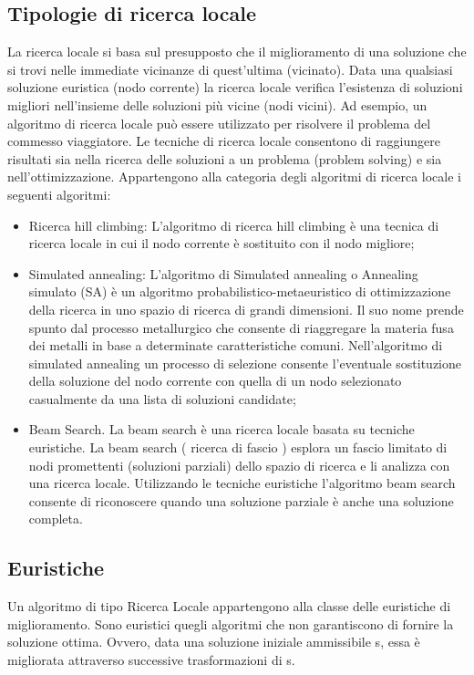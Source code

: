 \subsection{Tipologie di ricerca locale}\label{subsec:es_subsec}
La ricerca locale si basa sul presupposto che il miglioramento di una soluzione che si trovi nelle immediate vicinanze di quest'ultima (vicinato).
Data una qualsiasi soluzione euristica (nodo corrente) la ricerca locale verifica l'esistenza di soluzioni migliori nell'insieme delle soluzioni più vicine 
(nodi vicini). Ad esempio, un algoritmo di ricerca locale può essere utilizzato per risolvere il problema del commesso viaggiatore. 
Le tecniche di ricerca locale consentono di raggiungere risultati sia nella ricerca delle soluzioni a un problema (problem solving) e sia 
nell'ottimizzazione. Appartengono alla categoria degli algoritmi di ricerca locale i seguenti algoritmi:
\begin{itemize}
    \item Ricerca hill climbing: L'algoritmo di ricerca hill climbing è una tecnica di ricerca locale in cui il nodo corrente è sostituito con il nodo migliore;
    \vspace{5pt}
    \item Simulated annealing: L'algoritmo di Simulated annealing o Annealing simulato (SA) è un algoritmo probabilistico-metaeuristico di ottimizzazione 
    della ricerca in uno spazio di ricerca di grandi dimensioni. Il suo nome prende spunto dal processo metallurgico che consente di riaggregare la materia fusa 
    dei metalli in base a determinate caratteristiche comuni. Nell'algoritmo di simulated annealing un processo di selezione consente l'eventuale sostituzione 
    della soluzione del nodo corrente con quella di un nodo selezionato casualmente da una lista di soluzioni candidate;
    \vspace{5pt}
    \item Beam Search. La beam search è una ricerca locale basata su tecniche euristiche. La beam search ( ricerca di fascio ) esplora un fascio limitato di 
    nodi promettenti (soluzioni parziali) dello spazio di ricerca e li analizza con una ricerca locale. Utilizzando le tecniche euristiche l'algoritmo beam search 
    consente di riconoscere quando una soluzione parziale è anche una soluzione completa.
\end{itemize}



\subsection{Euristiche}\label{subsec:es_subsec}
Un algoritmo di tipo Ricerca Locale appartengono alla classe delle euristiche di miglioramento. Sono euristici quegli algoritmi che non garantiscono di fornire 
la soluzione ottima. Ovvero, data una soluzione iniziale ammissibile s, essa è migliorata attraverso successive trasformazioni di s.

